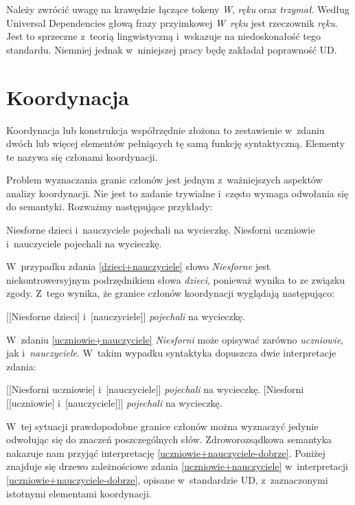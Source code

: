 Należy zwrócić uwagę na krawędzie łączące tokeny \emph{W}, \emph{ręku} oraz \emph{trzymał}. Według Universal Dependencies głową frazy przyimkowej \emph{W~ręku} jest rzeczownik \emph{ręku}. Jest to sprzeczne z~teorią lingwistyczną i~wskazuje na niedoskonałość tego standardu. Niemniej jednak w~niniejszej pracy będę zakładał poprawność UD.

\section{Koordynacja}

Koordynacja lub konstrukcja współrzędnie złożona to zestawienie w~zdaniu dwóch lub więcej elementów pełniących tę samą funkcję syntaktyczną. Elementy te nazywa się członami koordynacji.

Problem wyznaczania granic członów jest jednym z~ważniejszych aspektów analizy koordynacji. Nie jest to zadanie trywialne i~często wymaga odwołania się do semantyki. Rozważmy następujące przykłady:

\begin{exe}
\ex \label{dzieci+nauczyciele} Niesforne dzieci i~nauczyciele pojechali na wycieczkę.
\ex \label{uczniowie+nauczyciele} Niesforni uczniowie i~nauczyciele pojechali na wycieczkę.
\end{exe}

W~przypadku zdania \eqref{dzieci+nauczyciele} słowo \emph{Niesforne} jest niekontrowersyjnym podrzędnikiem słowa \emph{dzieci}, ponieważ wynika to ze związku zgody.  Z~tego wynika, że granice członów koordynacji wyglądają następująco:

\begin{exe}
\ex \label{dzieci+nauczyciele-nawiasy}
{[[Niesforne dzieci] i~[nauczyciele]] \emph{pojechali} na wycieczkę.}
\end{exe}

W~zdaniu \eqref{uczniowie+nauczyciele} \emph{Niesforni} może opisywać zarówno \emph{uczniowie}, jak i~\emph{nauczyciele}. W~takim wypadku syntaktyka dopuszcza dwie interpretacje zdania:

\begin{exe}
\ex \label{uczniowie+nauczyciele-dobrze}
{[[Niesforni uczniowie] i~[nauczyciele]] \emph{pojechali} na wycieczkę.}
\ex \label{uczniowie+nauczyciele-źle}
{[Niesforni [[uczniowie] i~[nauczyciele]]] \emph{pojechali} na wycieczkę.}
\end{exe}

W~tej sytuacji prawdopodobne granice członów można wyznaczyć jedynie odwołując się do znaczeń poszczególnych słów. Zdroworozsądkowa semantyka nakazuje nam przyjąć interpretację \eqref{uczniowie+nauczyciele-dobrze}. Poniżej znajduje się drzewo zależnościowe zdania \eqref{uczniowie+nauczyciele} w~interpretacji \eqref{uczniowie+nauczyciele-dobrze}, opisane w~standardzie UD, z~zaznaczonymi istotnymi elementami koordynacji.

